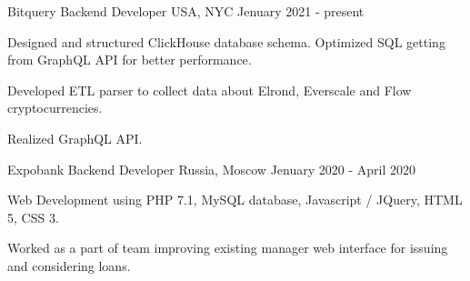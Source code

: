 

\begin{cventries}

  \cventry
    {Bitquery} %
    {Backend Developer} %
    {USA, NYC} %
    {Jenuary 2021 - present} %
    {
      \begin{cvitems} %
            \item {Designed and structured ClickHouse database schema. Optimized SQL getting from GraphQL API for better performance.}
          \item {Developed ETL parser to collect data about Elrond, Everscale and Flow cryptocurrencies.}
        \item {Realized GraphQL API.}
      \end{cvitems}
  }

  \cventry
    {Expobank} %
    {Backend Developer} %
    {Russia, Moscow} %
    {Jenuary 2020 - April 2020} %
    {
      \begin{cvitems} %
        \item {Web Development using PHP 7.1, MySQL database, Javascript / JQuery, HTML 5, CSS 3.}
        \item {Worked as a part of team improving existing manager web interface for issuing and considering loans.}
      \end{cvitems}
  }

\end{cventries}
